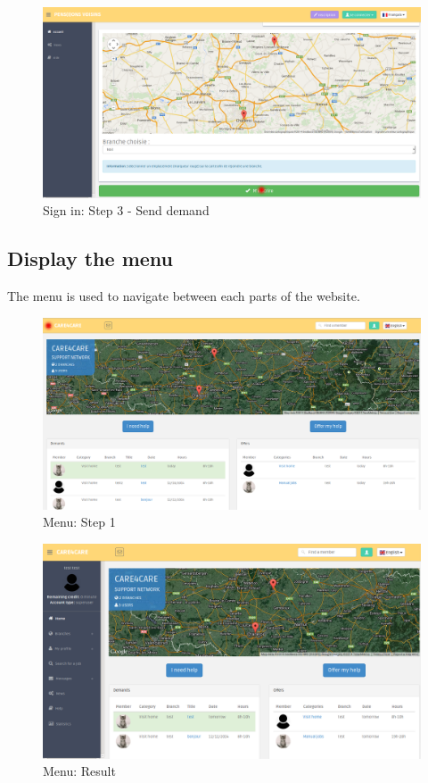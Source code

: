 \documentclass{article}
\begin{document}
\begin{figure}[!ht]
   \includegraphics[width=\textwidth]{img/inscr3.png}
   \caption{Sign in: Step 3 - Send demand}
\end{figure}

\clearpage
\subsection{Display the menu}
The menu is used to navigate between each parts of the website.
\begin{figure}[!ht]
   \includegraphics[width=\textwidth]{img/menu1.png}
   \caption{Menu: Step 1}
\end{figure}
\begin{figure}[!ht]
   \includegraphics[width=\textwidth]{img/menu2.png}
   \caption{Menu: Result}
\end{figure}
\end{document}
